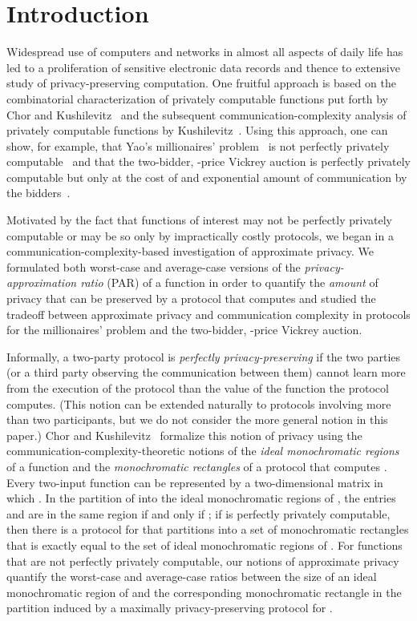 \documentclass{article}
\theoremstyle{theorem}
\theoremstyle{definition}
\theoremstyle{remark}
\begin{document}
\section{Introduction}\label{sec-intro}

Widespread use of computers and networks in almost all aspects of daily life has led to a
proliferation of sensitive electronic data records and thence to extensive study of privacy-preserving
computation.  One fruitful approach is based on the combinatorial characterization
of privately computable functions put forth by Chor and Kushilevitz~\cite{CK91} and the subsequent
communication-complexity analysis of privately computable functions by Kushilevitz~\cite{K92}.  Using this
approach, one can show, for example, that Yao's millionaires' problem~\cite{Y79} is not
perfectly privately computable~\cite{CK91} and that the two-bidder, -price Vickrey
auction is perfectly privately computable but only at the cost of and exponential amount of
communication by the bidders~\cite{BS}.

Motivated by the fact that functions of interest may not be perfectly
privately computable or may be so only by impractically costly protocols, we began
in \cite{fjs09tr14} a communication-complexity-based investigation of approximate privacy.
We formulated both worst-case and
average-case versions of the {\it privacy-approximation ratio} (PAR) of a
function  in order to quantify the {\it amount} of privacy that can be
preserved by a protocol that computes  and studied the tradeoff between
approximate privacy and communication complexity in protocols for the millionaires' problem
and the two-bidder, -price Vickrey auction.

Informally, a two-party protocol is \emph{perfectly
privacy-preserving} if the two parties (or a third party observing
the communication between them) cannot learn more from the execution
of the protocol than the value of the function the protocol
computes.  (This notion can be extended naturally to protocols
involving more than two participants, but we do not consider the more general notion
in this paper.)  Chor and Kushilevitz~\cite{CK91,K92} formalize this notion of privacy using
the communication-complexity-theoretic notions of the {\it ideal monochromatic regions} of
a function  and the {\it monochromatic rectangles} of a protocol  that computes .
Every two-input function  can be represented by a two-dimensional matrix  in which
.  In the partition of  into the ideal monochromatic
regions of , the entries  and  are in the same region
if and only if ; if  is perfectly privately computable, then there
is a protocol  for  that partitions  into a set of monochromatic rectangles that
is exactly equal to the set of ideal monochromatic regions of .  For functions that are
not perfectly privately computable, our notions of approximate privacy~\cite{fjs09tr14}
quantify the worst-case and average-case ratios between the size of an ideal monochromatic
region of  and the corresponding monochromatic rectangle in the partition induced by a
maximally privacy-preserving protocol for .
\end{document}

